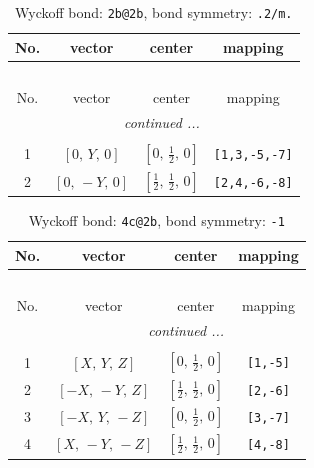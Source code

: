 \documentclass[fleqn,8pt]{jsarticle}
\begin{document}
\renewcommand{\arraystretch}{1.2}
\begin{longtable}{cccc}
\caption{Wyckoff bond: {\tt 2b@2b}, bond symmetry: {\tt .2/m.}}
 \\
 \hline \hline
No. & vector & center & mapping \\ \hline \endfirsthead

\multicolumn{3}{l}{\tablename\ \thetable{}} \\
 \hline \hline
No. & vector & center & mapping \\ \hline \endhead

 \hline \hline
\multicolumn{3}{r}{\footnotesize\it continued ...} \\ \endfoot

 \hline \hline
\multicolumn{3}{r}{} \\ \endlastfoot

1 & $\left[ 0,\, Y,\, 0 \right]$ & $\left[ 0,\, \frac{1}{2},\, 0 \right]$ & {\tt [1,3,-5,-7]} \\ \hline
2 & $\left[ 0,\, - Y,\, 0 \right]$ & $\left[ \frac{1}{2},\, \frac{1}{2},\, 0 \right]$ & {\tt [2,4,-6,-8]} \\
\end{longtable}
\renewcommand{\arraystretch}{1.2}
\begin{longtable}{cccc}
\caption{Wyckoff bond: {\tt 4c@2b}, bond symmetry: {\tt -1}}
 \\
 \hline \hline
No. & vector & center & mapping \\ \hline \endfirsthead

\multicolumn{3}{l}{\tablename\ \thetable{}} \\
 \hline \hline
No. & vector & center & mapping \\ \hline \endhead

 \hline \hline
\multicolumn{3}{r}{\footnotesize\it continued ...} \\ \endfoot

 \hline \hline
\multicolumn{3}{r}{} \\ \endlastfoot

1 & $\left[ X,\, Y,\, Z \right]$ & $\left[ 0,\, \frac{1}{2},\, 0 \right]$ & {\tt [1,-5]} \\ \hline
2 & $\left[ - X,\, - Y,\, Z \right]$ & $\left[ \frac{1}{2},\, \frac{1}{2},\, 0 \right]$ & {\tt [2,-6]} \\ \hline
3 & $\left[ - X,\, Y,\, - Z \right]$ & $\left[ 0,\, \frac{1}{2},\, 0 \right]$ & {\tt [3,-7]} \\ \hline
4 & $\left[ X,\, - Y,\, - Z \right]$ & $\left[ \frac{1}{2},\, \frac{1}{2},\, 0 \right]$ & {\tt [4,-8]} \\
\end{longtable}
\end{document}
